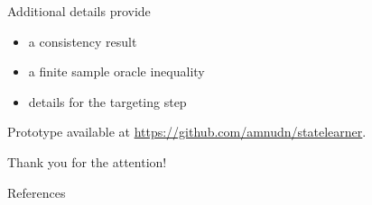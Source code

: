 \documentclass[smaller]{beamer}\usepackage{listings}
\newcommand{\1}{\mathds{1}}
\begin{document}
\begin{frame}[label={sec:orge07070d}]{Additional details}
\cite{munch2024state} provide
\begin{itemize}
\item a consistency result
\item a finite sample oracle inequality
\item details for the targeting step
\end{itemize}

\vfill

Prototype available at \url{https://github.com/amnudn/statelearner}.

\vfill

\flushright \color{bblue} Thank you for the attention!
\end{frame}


\begin{frame}[label={sec:org0e4de4e}]{References}
\footnotesize 
\end{frame}
\end{document}
